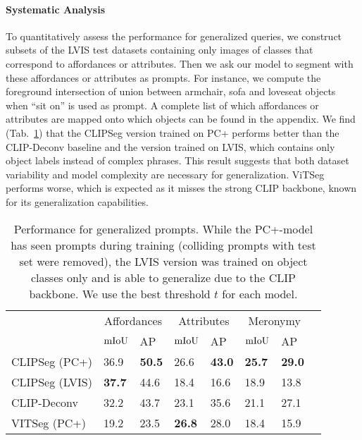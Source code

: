 \paragraph{Systematic Analysis}
To quantitatively assess the performance for generalized queries, we construct subsets of the LVIS test datasets containing only images of classes that correspond to affordances or attributes.
Then we ask our model to segment with these affordances or attributes as prompts. For instance, we compute the foreground intersection of union between armchair, sofa and loveseat objects when ``sit on'' is used as prompt.
A complete list of which affordances or attributes are mapped onto which objects can be found in the appendix.
We find (Tab.~\ref{tab:generalize}) that the CLIPSeg version trained on PC+ performs better than the CLIP-Deconv baseline and the version trained on LVIS, which contains only object labels instead of complex phrases. This result suggests that both dataset variability and model complexity are necessary for generalization. 
ViTSeg performs worse, which is expected as it misses the strong CLIP backbone, known for its generalization capabilities.

\begin{table}
    \centering
    \footnotesize
    \begin{tabular}{llllllll}
        \toprule
         & \multicolumn{2}{c}{Affordances} & \multicolumn{2}{c}{Attributes} & \multicolumn{2}{c}{Meronymy}  \\
        &  $\text{mIoU}$ &  AP & $\text{mIoU}$ & AP & $\text{mIoU}$  & AP \\
        \midrule
CLIPSeg (PC+) & 36.9 & \textbf{50.5} & 26.6 & \textbf{43.0} & \textbf{25.7} & \textbf{29.0} \\ 
CLIPSeg (LVIS)  & \textbf{37.7} & 44.6 & 18.4 & 16.6 & 18.9 & 13.8 \\ 
CLIP-Deconv & 32.2 & 43.7 & 23.1 & 35.6 & 21.1 & 27.1 \\ 
VITSeg (PC+) & 19.2 & 23.5 & \textbf{26.8} & 28.0 & 18.4 & 15.9 \\
         \bottomrule
    \end{tabular}%
    \caption{Performance for generalized prompts. While the PC+-model has seen prompts during training (colliding prompts with test set were removed), the LVIS version was trained on object classes only and is able to generalize due to the CLIP backbone. We use the best threshold $t$ for each model.}
    \label{tab:generalize}
\end{table}

